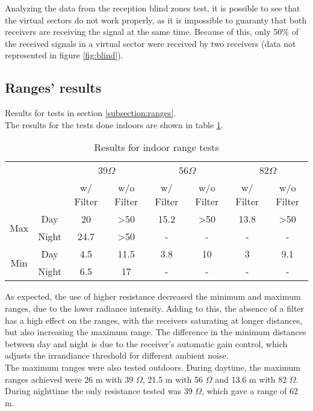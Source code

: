 Analyzing the data from the reception blind zones test, it is possible to see that the virtual sectors do not work properly, as it is impossible to guaranty that both receivers are receiving the signal at the same time. Because of this, only 50\% of the received signals in a virtual sector were received by two receivers (data not represented in figure \ref{fig:blind}).\\

\subsection{Ranges' results}
\label{subsection:rangesresults}
Results for tests in section \ref{subsection:ranges}.\\
The results for the tests done indoors are shown in table \ref{tab:ranges}.
\begin{table}[!ht]
\centering
\caption[Results for Indoor Range Tests]{Results for indoor range tests}
\label{tab:ranges}
\begin{tabular}{@{}cccccccc@{}}
\toprule
                     &       & \multicolumn{2}{c}{39$\Omega$} & \multicolumn{2}{c}{56$\Omega$} & \multicolumn{2}{c}{82$\Omega$} \\ \cmidrule(l){3-8} 
                     &       & w/ Filter   & w/o Filter       & w/ Filter   & w/o Filter       & w/ Filter   & w/o Filter       \\
\multirow{2}{*}{Max} & Day   & 20          & \textgreater50   & 15.2        & \textgreater50   & 13.8        & \textgreater50   \\
                     & Night & 24.7        & \textgreater50   & -           & -                & -           & -                \\
\multirow{2}{*}{Min} & Day   & 4.5         & 11.5             & 3.8         & 10               & 3        	 & 9.1 \\
                     & Night & 6.5         & 17               & -           & -                & -           & -                \\ \hline
\end{tabular}
\end{table}

As expected, the use of higher resistance decreased the minimum and maximum ranges, due to the lower radiance intensity. Adding to this, the absence of a filter has a high effect on the ranges, with the receivers saturating at longer distances, but also increasing the maximum range. The difference in the minimum distances between day and night is due to the receiver's automatic gain control, which adjusts the irrandiance threshold for different ambient noise.\\
The maximum ranges were also tested outdoors. During daytime, the maximum ranges achieved were 26 m with 39 $\Omega$, 21.5 m with 56 $\Omega$ and 13.6 m with 82 $\Omega$. During nighttime the only resistance tested was 39 $\Omega$, which gave a range of 62 m.\\

